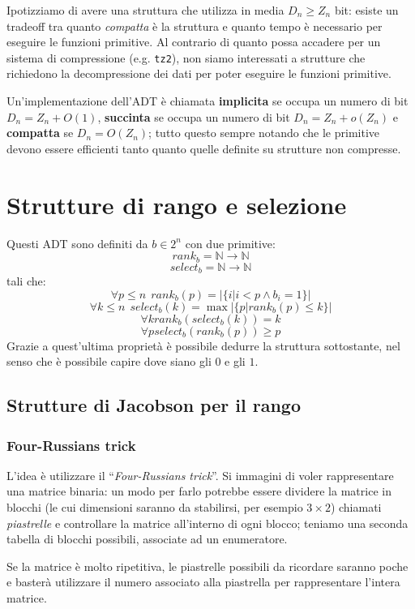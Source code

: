 Ipotizziamo di avere una struttura che utilizza in media $D_n \geq Z_n$ bit:
esiste un tradeoff tra quanto \textit{compatta} è la struttura e quanto
tempo è necessario per eseguire le funzioni primitive. Al contrario di quanto
possa accadere per un sistema di compressione (e.g. \texttt{tz2}), non siamo
interessati a strutture che richiedono la decompressione dei dati per poter
eseguire le funzioni primitive.

Un'implementazione dell'ADT è chiamata \textbf{implicita} se occupa un numero
di bit $D_n = Z_n + O(1)$, \textbf{succinta} se occupa un numero di bit
$D_n = Z_n + o(Z_n)$ e \textbf{compatta} se $D_n = O(Z_n)$; tutto questo sempre
notando che le primitive devono essere efficienti tanto quanto quelle definite
su strutture non compresse.

\section{Strutture di rango e selezione}
Questi ADT sono definiti da $b \in 2^n$ con due primitive:
$$
	rank_b = \mathbb{N} \rightarrow \mathbb{N}
$$
$$
	select_b= \mathbb{N} \rightarrow \mathbb{N}
$$
tali che:
$$
	\forall p \leq n ~~ rank_b(p) = |\{i | i < p \land b_i = 1\}|
$$
$$
	\forall k \leq n ~~ select_b(k) =\max |\{p | rank_b(p) \leq k\}|
$$
$$
	\forall k rank_b(select_b(k)) = k
$$
$$
	\forall p select_b(rank_b(p)) \geq p
$$
Grazie a quest'ultima proprietà è possibile dedurre la struttura sottostante,
nel senso che è possibile capire dove siano gli $0$ e gli $1$.

\subsection{Strutture di Jacobson per il rango}
\subsubsection{Four-Russians trick}
L'idea è utilizzare il ``\textit{Four-Russians trick}''. Si immagini di
voler rappresentare una matrice binaria: un modo per farlo potrebbe essere
dividere la matrice in blocchi (le cui dimensioni saranno da stabilirsi, per esempio $3\times 2$)
chiamati \textit{piastrelle} e controllare la matrice all'interno di ogni blocco;
teniamo una seconda tabella di blocchi possibili, associate ad un enumeratore.



Se la matrice è molto ripetitiva, le piastrelle possibili da ricordare saranno
poche e basterà utilizzare il numero associato alla piastrella per rappresentare
l'intera matrice.

